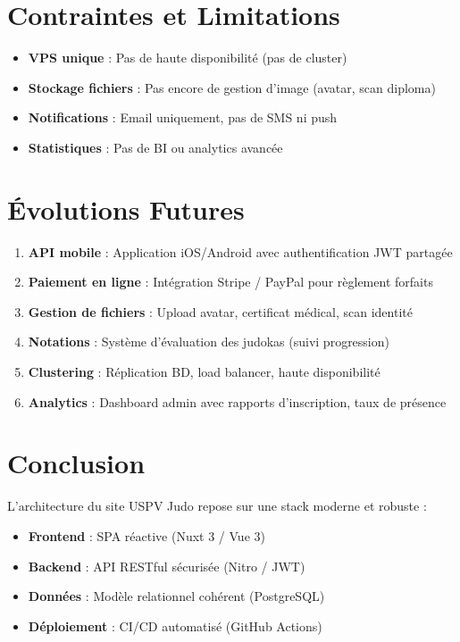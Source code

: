 \documentclass[11pt,a4paper]{article}
\begin{document}
\section{Contraintes et Limitations}

\begin{itemize}
  \item \textbf{VPS unique} : Pas de haute disponibilité (pas de cluster)
  \item \textbf{Stockage fichiers} : Pas encore de gestion d'image (avatar, scan diploma)
  \item \textbf{Notifications} : Email uniquement, pas de SMS ni push
  \item \textbf{Statistiques} : Pas de BI ou analytics avancée
\end{itemize}

\section{Évolutions Futures}

\begin{enumerate}
  \item \textbf{API mobile} : Application iOS/Android avec authentification JWT partagée
  \item \textbf{Paiement en ligne} : Intégration Stripe / PayPal pour règlement forfaits
  \item \textbf{Gestion de fichiers} : Upload avatar, certificat médical, scan identité
  \item \textbf{Notations} : Système d'évaluation des judokas (suivi progression)
  \item \textbf{Clustering} : Réplication BD, load balancer, haute disponibilité
  \item \textbf{Analytics} : Dashboard admin avec rapports d'inscription, taux de présence
\end{enumerate}

\section{Conclusion}

L'architecture du site USPV Judo repose sur une stack moderne et robuste :
\begin{itemize}
  \item \textbf{Frontend} : SPA réactive (Nuxt 3 / Vue 3)
  \item \textbf{Backend} : API RESTful sécurisée (Nitro / JWT)
  \item \textbf{Données} : Modèle relationnel cohérent (PostgreSQL)
  \item \textbf{Déploiement} : CI/CD automatisé (GitHub Actions)
\end{itemize}
\end{document}
